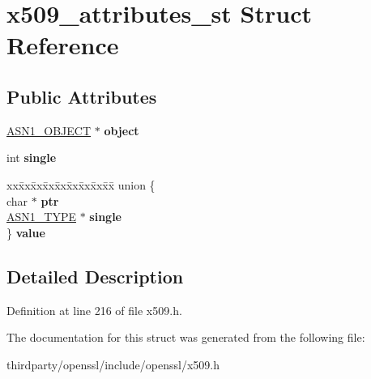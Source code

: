 \hypertarget{structx509__attributes__st}{}\section{x509\+\_\+attributes\+\_\+st Struct Reference}
\label{structx509__attributes__st}
\subsection*{Public Attributes}
\begin{DoxyCompactItemize}
\item 
\mbox{\label{structx509__attributes__st_a646d7a1b46e88eb3b0e337e08bd08a02}} 
\hyperlink{structasn1__object__st}{A\+S\+N1\+\_\+\+O\+B\+J\+E\+CT} $\ast$ {\bfseries object}
\item 
\mbox{\label{structx509__attributes__st_a04dd95e9253f6b16f682e70eb5eec2ca}} 
int {\bfseries single}
\item 
\mbox{\label{structx509__attributes__st_a0fa0ae44faeacb8a895baeb2192b768b}} 
\begin{tabbing}
xx\=xx\=xx\=xx\=xx\=xx\=xx\=xx\=xx\=\kill
union \{\\
\>char $\ast$ {\bfseries ptr}\\
\>\hyperlink{structasn1__type__st}{ASN1\_TYPE} $\ast$ {\bfseries single}\\
\} {\bfseries value}\\

\end{tabbing}\end{DoxyCompactItemize}


\subsection{Detailed Description}


Definition at line 216 of file x509.\+h.



The documentation for this struct was generated from the following file\+:\begin{DoxyCompactItemize}
\item 
thirdparty/openssl/include/openssl/x509.\+h\end{DoxyCompactItemize}
